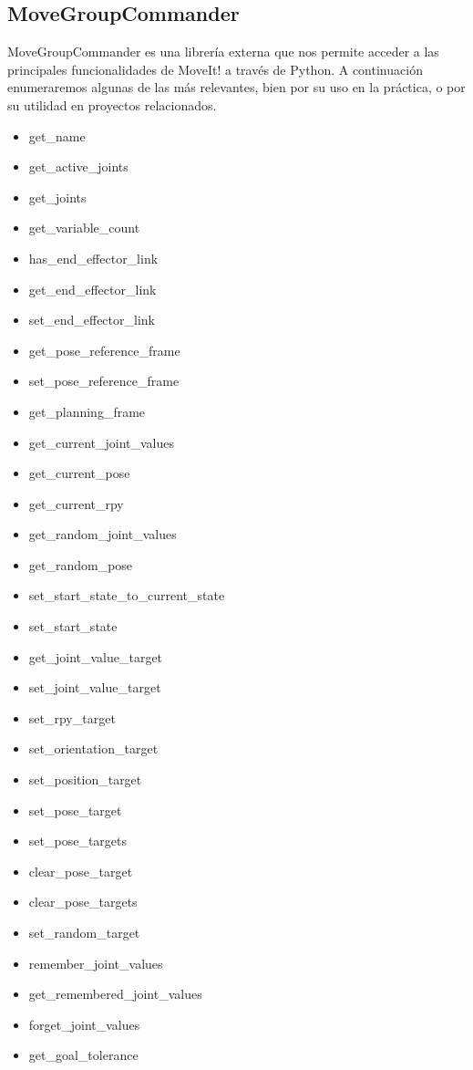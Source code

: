 \documentclass[12pt,spanish,chapterprefix, numbers=noenddot]{book}
\numberwithin{equation}{section}
\numberwithin{figure}{section}
\begin{document}
\subsection{MoveGroupCommander}
MoveGroupCommander es una librería externa que nos permite acceder a las principales funcionalidades de MoveIt! a través de Python. A continuación enumeraremos algunas de las más relevantes, bien por su uso en la práctica, o por su utilidad en proyectos relacionados. 
\begin{itemize}
\item get\_name
\item get\_active\_joints
\item get\_joints
\item get\_variable\_count
\item has\_end\_effector\_link
\item get\_end\_effector\_link
\item set\_end\_effector\_link
\item get\_pose\_reference\_frame
\item set\_pose\_reference\_frame
\item get\_planning\_frame
\item get\_current\_joint\_values
\item get\_current\_pose
\item get\_current\_rpy
\item get\_random\_joint\_values
\item get\_random\_pose
\item set\_start\_state\_to\_current\_state
\item set\_start\_state
\item get\_joint\_value\_target
\item set\_joint\_value\_target
\item set\_rpy\_target
\item set\_orientation\_target
\item set\_position\_target
\item set\_pose\_target
\item set\_pose\_targets
\item clear\_pose\_target
\item clear\_pose\_targets
\item set\_random\_target
\item remember\_joint\_values
\item get\_remembered\_joint\_values
\item forget\_joint\_values
\item get\_goal\_tolerance

\end{itemize}
\end{document}
